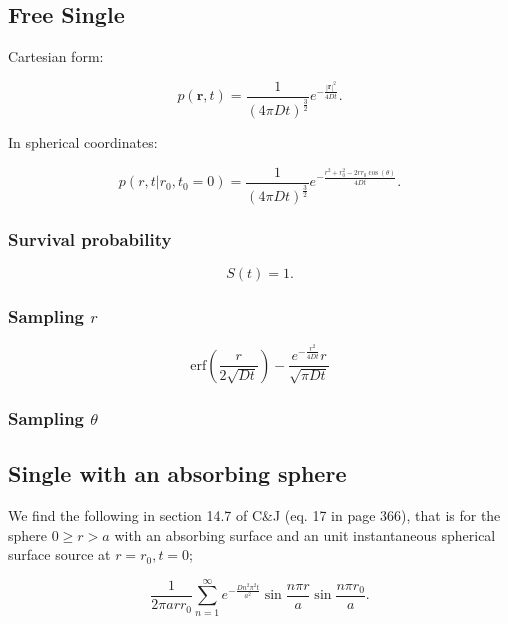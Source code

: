 \documentclass[english]{article}
\begin{document}
\subsection{Free Single}

Cartesian form:

\begin{equation}
p(\mathbf{r},t)=
\frac{1}{(4\pi Dt)^{\frac{3}{2}}}e^{-\frac{|\mathbf{r}|^{2}}{4Dt}}.
\end{equation}


In spherical coordinates:

\begin{equation}
  p(r,t|r_{0},t_{0}=0)=
  \frac{1}{(4\pi Dt)^{\frac{3}{2}}}
  e^{-\frac{r^{2}+r_{0}^{2}-2rr_{0}\cos(\theta)}
    {4Dt}}.
\end{equation}


\subsubsection{Survival probability}

\begin{equation}
S(t)=1.
\end{equation}


\subsubsection{Sampling $r$}

\begin{equation}
\mathrm{erf}\left(\frac{r}{2 \sqrt{Dt}}\right) 
- \frac{e^{-\frac{r^2}{4 D t}} r}{\sqrt{\pi D t}}
\end{equation}


\subsubsection{Sampling $\theta$}


\subsection{Single with an absorbing sphere}

We find the following in section 14.7 of C\&J (eq. 17 in page 366),
that is for the sphere $0 \geq r>a$ with an absorbing surface and
an unit instantaneous spherical surface source at $r=r_{0},t=0$;

\begin{equation}
\frac{1}{2\pi arr_{0}}\sum_{n=1}^{\infty}e^{-\frac{Dn^{2}\pi^{2}t}{a^{2}}}\sin\frac{n\pi r}{a}\sin\frac{n\pi r_{0}}{a}.\end{equation}
\end{document}
